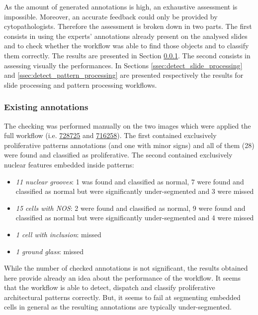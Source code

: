 As the amount of generated annotations is high, an exhaustive assessment is impossible. Moreover, an accurate feedback could only be provided by cytopathologists. Therefore the assessment is broken down in two parts. The first consists in using the experts' annotations already present on the analysed slides and to check whether the workflow was able to find those objects and to classify them correctly. The results are presented in Section \ref{fig:existing_annotations}. The second consists in assessing visually the performances. In Sections \ref{ssec:detect_slide_processing} and \ref{ssec:detect_pattern_processing} are presented respectively the results for slide processing and pattern processing workflows. 

\subsubsection{Existing annotations}
\label{fig:existing_annotations}
The checking was performed manually on the two images which were applied the full workflow (i.e. \href{http://beta.cytomine.be/#tabs-image-716498-728725-}{728725} and \href{http://beta.cytomine.be/#tabs-image-716498-716258-}{716258}). The first contained exclusively proliferative patterns annotations (and one with minor signs) and all of them (28) were found and classified as proliferative. The second contained exclusively nuclear features embedded inside patterns:

\begin{itemize}
	\item \textit{11 nuclear grooves}: 1 was found and classified as normal, 7 were found and classified as normal but were significantly under-segmented and 3 were missed
	\item \textit{15 cells with NOS}: 2 were found and classified as normal, 9 were found and classified as normal but were significantly under-segmented and 4 were missed
	\item \textit{1 cell with inclusion}: missed
	\item \textit{1 ground glass}: missed
\end{itemize}

While the number of checked annotations is not significant, the results obtained here provide already an idea about the performance of the workflow. It seems that the workflow is able to detect, dispatch and classify proliferative architectural patterns correctly. But, it seems to fail at segmenting embedded cells in general as the resulting annotations are typically under-segmented. 

